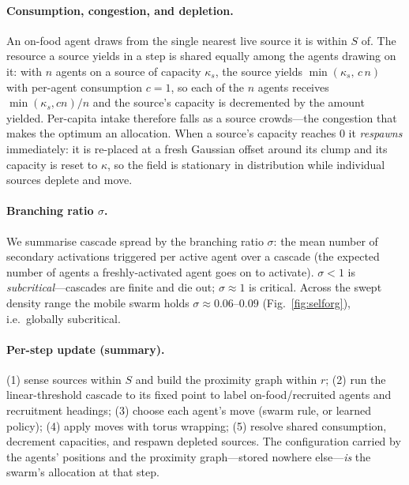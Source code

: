 \documentclass{article}
\begin{document}
\paragraph{Consumption, congestion, and depletion.} An on-food agent draws from the single nearest live source
it is within $S$ of. The resource a source yields in a step is shared equally among the agents drawing on it:
with $n$ agents on a source of capacity $\kappa_s$, the source yields $\min(\kappa_s,\,c\,n)$ with per-agent
consumption $c{=}1$, so each of the $n$ agents receives $\min(\kappa_s,cn)/n$ and the source's capacity is
decremented by the amount yielded. Per-capita intake therefore falls as a source crowds---the congestion that
makes the optimum an allocation. When a source's capacity reaches $0$ it \emph{respawns} immediately: it is
re-placed at a fresh Gaussian offset around its clump and its capacity is reset to $\kappa$, so the field is
stationary in distribution while individual sources deplete and move.

\paragraph{Branching ratio $\sigma$.} We summarise cascade spread by the branching ratio $\sigma$: the mean
number of secondary activations triggered per active agent over a cascade (the expected number of agents a
freshly-activated agent goes on to activate). $\sigma<1$ is \emph{subcritical}---cascades are finite and die
out; $\sigma\approx1$ is critical. Across the swept density range the mobile swarm holds $\sigma\approx0.06$--$0.09$
(Fig.~\ref{fig:selforg}), i.e.\ globally subcritical.

\paragraph{Per-step update (summary).} (1) sense sources within $S$ and build the proximity graph within $r$;
(2) run the linear-threshold cascade to its fixed point to label on-food/recruited agents and recruitment
headings; (3) choose each agent's move (swarm rule, or learned policy); (4) apply moves with torus wrapping;
(5) resolve shared consumption, decrement capacities, and respawn depleted sources. The configuration carried by
the agents' positions and the proximity graph---stored nowhere else---\emph{is} the swarm's allocation at that
step.
\end{document}
